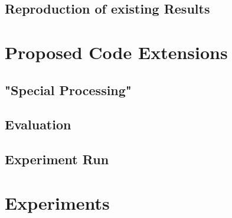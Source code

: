 \subsection{Reproduction of existing Results}
\label{ch:conceptualDesign-existingCodeBase-reproductionOfExistingResults}

\section{Proposed Code Extensions}
\label{ch:conceptualDesign-codeExtensions}

\subsection{"Special Processing"}
\label{ch:conceptualDesign-codeExtensions-dataPreprocessing}



\subsection{Evaluation}
\label{ch:conceptualDesign-codeExtensions-evaluation}


\subsection{Experiment Run}
\label{ch:conceptualDesign-codeExtensions-experimentRun}


\section{Experiments}

